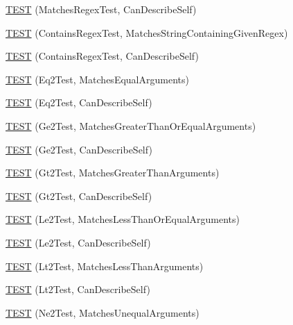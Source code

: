 \begin{DoxyCompactItemize}
\item 
\hyperlink{namespacetesting_1_1gmock__matchers__test_acb4e75ec699fe1bc178e7ec32fb479c8}{T\+E\+ST} (Matches\+Regex\+Test, Can\+Describe\+Self)
\item 
\hyperlink{namespacetesting_1_1gmock__matchers__test_a0a23f3ff8f97ccf74cd64673edc6694f}{T\+E\+ST} (Contains\+Regex\+Test, Matches\+String\+Containing\+Given\+Regex)
\item 
\hyperlink{namespacetesting_1_1gmock__matchers__test_ac3d469a146dec0c6ede2b46ff992c8d7}{T\+E\+ST} (Contains\+Regex\+Test, Can\+Describe\+Self)
\item 
\hyperlink{namespacetesting_1_1gmock__matchers__test_a768adf8450910e4c3ac0cb2caec8a4c2}{T\+E\+ST} (Eq2\+Test, Matches\+Equal\+Arguments)
\item 
\hyperlink{namespacetesting_1_1gmock__matchers__test_a45da3962b4ae052dd47e1ae1bfd8b762}{T\+E\+ST} (Eq2\+Test, Can\+Describe\+Self)
\item 
\hyperlink{namespacetesting_1_1gmock__matchers__test_a100bae52c11f2e44a141652002d3bee2}{T\+E\+ST} (Ge2\+Test, Matches\+Greater\+Than\+Or\+Equal\+Arguments)
\item 
\hyperlink{namespacetesting_1_1gmock__matchers__test_aaee5baf487e6234d1d8b6779b70a15c0}{T\+E\+ST} (Ge2\+Test, Can\+Describe\+Self)
\item 
\hyperlink{namespacetesting_1_1gmock__matchers__test_a4ef0cb0e88b7801075798649189d7b72}{T\+E\+ST} (Gt2\+Test, Matches\+Greater\+Than\+Arguments)
\item 
\hyperlink{namespacetesting_1_1gmock__matchers__test_ae7351eb01d03897324b2fe03045f2c10}{T\+E\+ST} (Gt2\+Test, Can\+Describe\+Self)
\item 
\hyperlink{namespacetesting_1_1gmock__matchers__test_add304ba60989990fc78a616c9592a948}{T\+E\+ST} (Le2\+Test, Matches\+Less\+Than\+Or\+Equal\+Arguments)
\item 
\hyperlink{namespacetesting_1_1gmock__matchers__test_a75d0bbfa66d404aa458f0739297c9edc}{T\+E\+ST} (Le2\+Test, Can\+Describe\+Self)
\item 
\hyperlink{namespacetesting_1_1gmock__matchers__test_ac7ecdd71d0cc49438f7ad1863fdfab05}{T\+E\+ST} (Lt2\+Test, Matches\+Less\+Than\+Arguments)
\item 
\hyperlink{namespacetesting_1_1gmock__matchers__test_a9f557c4688b2907704650cc18cfd9dcf}{T\+E\+ST} (Lt2\+Test, Can\+Describe\+Self)
\item 
\hyperlink{namespacetesting_1_1gmock__matchers__test_a69692057d2825f6fc8a37265667867c7}{T\+E\+ST} (Ne2\+Test, Matches\+Unequal\+Arguments)

\end{DoxyCompactItemize}
